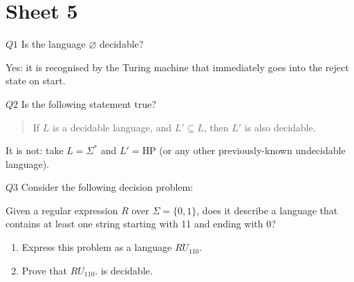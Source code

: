 \documentclass{article}
\theoremstyle{definition}
\theoremstyle{definition}
\theoremstyle{remark}
\begin{document}
\newpage

\section{Sheet 5}


\begin{questionbox}{$Q1$}
    Is the language $\varnothing$ decidable?
\end{questionbox}

\bigskip

Yes: it is recognised by the Turing machine that immediately goes into the reject state on start.



\begin{questionbox}{$Q2$}
    Is the following statement true?
    \begin{quote}
        If $L$ is a decidable language, and $L'\subseteq L$, then $L'$ is also decidable.
    \end{quote}
\end{questionbox}

\bigskip

It is not: take $L=\Sigma^\ast$ and $L'=\text{HP}$ (or any other previously-known undecidable language).


\begin{questionbox}{$Q3$}
    Consider the following decision problem:
    \begin{center}
        Given a regular expression $R$ over $\Sigma=\{0,1\}$, does it describe a language that contains at least one string starting with 11 and ending with 0?
    \end{center}
    \begin{enumerate}
        \item[$(i)$] Express this problem as a language $RU_{110}$.
        
        \item[$(ii)$] Prove that $RU_{110}$. is decidable.
    \end{enumerate}
\end{questionbox}

\bigskip
\end{document}
